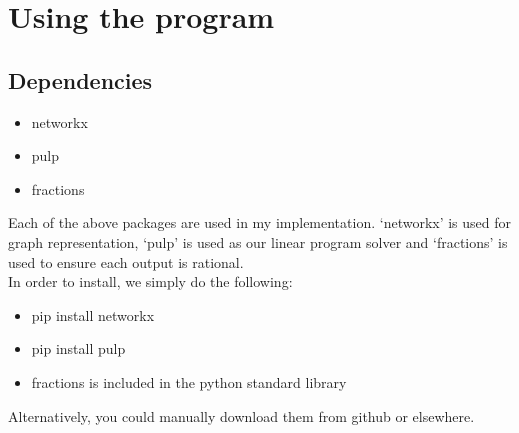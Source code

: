 \documentclass[12pt, a4paper]{article}
\begin{document}
\renewcommand\refname{Bibliography}
\pagestyle{MainStyle}







\section*{Using the program}
\subsection*{Dependencies}
\begin{itemize}[label=\raisebox{0.25ex}{\tiny$\bullet$}]
\itemsep0em
\item networkx
\item pulp
\item fractions
\end{itemize}
Each of the above packages are used in my implementation. `networkx' is used for graph representation, `pulp' is used as our linear program solver and `fractions' is used to ensure each output is rational.\\
In order to install, we simply do the following:
\begin{itemize}[label=\raisebox{0.25ex}{\tiny$\bullet$}]
\itemsep0em
\item pip install networkx
\item pip install pulp
\item fractions is included in the python standard library
\end{itemize}
Alternatively, you could manually download them from github or elsewhere.
\end{document}
